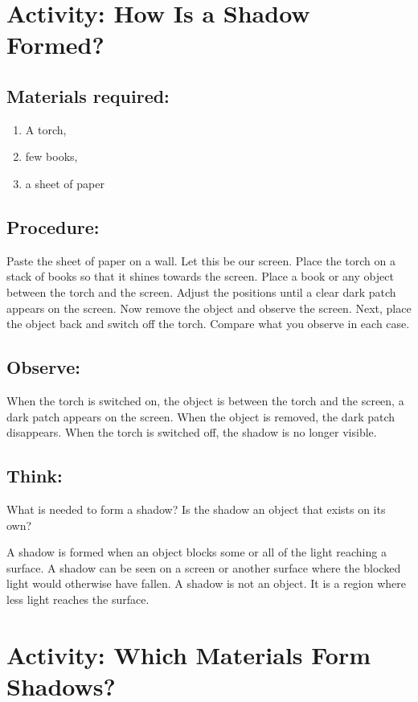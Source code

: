 \documentclass{xtufte-handout}
\begin{document}
\section{Activity: How Is a Shadow Formed?}

\subsection{Materials required:} 
\begin{enumerate}
  \item A torch, 
  \item few books, 
  \item a sheet of paper
\end{enumerate}
\subsection{Procedure:}
Paste the sheet of paper on a wall. Let this be our screen. Place the torch on a stack of books so that it shines towards the screen. Place a book or any object between the torch and the screen. Adjust the positions until a clear dark patch appears on the screen. Now remove the object and observe the screen. Next, place the object back and switch off the torch. Compare what you observe in each case.

\subsection{Observe:} When the torch is switched on, the object is between the torch and the screen, a dark patch appears on the screen. When the object is removed, the dark patch disappears. When the torch is switched off, the shadow is no longer visible. 

\subsection{Think:} What is needed to form a shadow? Is the shadow an object that exists on its own?

A shadow is formed when an object blocks some or all of the light reaching a surface. A shadow can be seen on a screen or another surface where the blocked light would otherwise have fallen. A shadow is not an object. It is a region where less light reaches the surface.

\section{Activity: Which Materials Form Shadows?}
\end{document}
